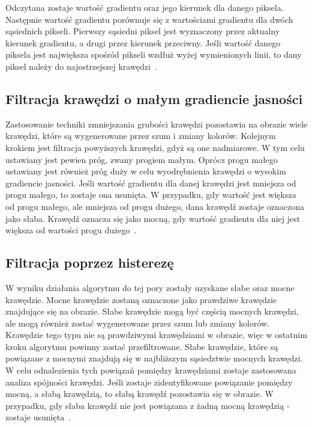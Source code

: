 \documentclass[a4paper,twoside,12pt]{book}
\begin{document}
    Odczytana zostaje wartość gradientu oraz jego kierunek dla danego piksela.
    Następnie wartość gradientu porównuje się z wartościami gradientu dla
    dwóch sąsiednich pikseli.
    Pierwszy sąsiedni piksel jest wyznaczony przez aktualny kierunek gradientu, a drugi przez kierunek przeciwny.
    Jeśli wartość danego piksela jest największa spośród pikseli wzdłuż wyżej wymienionych linii,
    to dany piksel należy do najostrzejszej krawędzi~\cite{Canny}.

    \subsection{Filtracja krawędzi o małym gradiencie jasności}\label{subsec:filtracja-krawędzi-o-małym-gradiencie-jasności}
    Zastosowanie techniki zmniejszania grubości krawędzi pozostawia na obrazie wiele krawędzi, które są wygenerowane przez szum i zmiany
    kolorów.
    Kolejnym krokiem jest filtracja powyższych krawędzi, gdyż są one nadmiarowe.
    W tym celu ustawiany jest pewien próg, zwany progiem małym.
    Oprócz progu małego ustawiany jest również próg duży w celu wyodrębnienia krawędzi o wysokim gradiencie jasności.
    Jeśli wartość gradientu dla danej krawędzi jest mniejsza od progu małego, to zostaje ona usunięta.
    W przypadku, gdy wartość jest większa od progu małego, ale mniejsza od progu dużego, dana krawędź
    zostaje oznaczona jako słaba.
    Krawędź oznacza się jako mocną, gdy wartość gradientu dla niej jest większa od wartości progu dużego~\cite{Canny}.

    \subsection{Filtracja poprzez histerezę}\label{subsec:filtracja-poprzez-histerezę}
    W wyniku działania algorytmu do tej pory zostały uzyskane słabe oraz mocne krawędzie.
    Mocne krawędzie zostaną oznaczone jako prawdziwe krawędzie znajdujące się na obrazie.
    Słabe krawędzie mogą być częścią mocnych krawędzi, ale
    mogą również zostać wygenerowane przez szum lub zmiany kolorów.
    Krawędzie tego typu nie są prawdziwymi krawędziami w obrazie, więc w ostatnim kroku algorytmu powinny zostać
    przefiltrowane.
    Słabe krawędzie, które są powiązane z mocnymi znajdują się w najbliższym sąsiedztwie mocnych krawędzi.
    W celu odnalezienia tych powiązań pomiędzy krawędziami zostaje zastosowana analiza spójności krawędzi.
    Jeśli zostaje zidentyfikowane powiązanie pomiędzy mocną, a słabą krawędzią, to słabą krawędź pozostawia się w obrazie.
    W przypadku, gdy słaba krawędź nie jest powiązana z żadną mocną krawędzią - zostaje usunięta~\cite{Canny}.
\end{document}
